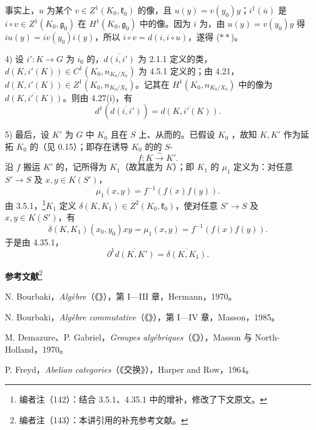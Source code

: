事实上，$u$ 为某个 $v\in Z^1(K_0,\mathfrak k_0)$ 的像，且 $u(y)=v(y_0)y$；$i^1(\overline u)$ 是 $i\circ v\in Z^1(K_0,\mathfrak g_0)$ 在 $H^1(K_0,\mathfrak g_0)$ 中的像。因为 $i$ 为，由 $u(y)=v(y_0)y$ 得 $iu(y)=iv(y_0)i(y)$，所以 $i\circ v=d(i,i\circ u)$，遂得 ($**$)。

4) 设 $i':K\to G$ 为 $i_0$ 的，$\overline{d(i,i')}$ 为 2.1.1 定义的类，$d(K,i'(K))\in C^1(K_0,n_{K_0/X_0})$ 为 4.5.1 定义的；由 4.21，$d(K,i'(K))\in Z^1(K_0,n_{K_0/X_0})$。记其在 $H^1(K_0,n_{K_0/X_0})$ 中的像为 $\overline{d(K,i'(K))}$。则由 4.27(i)，有
\[d^1(\overline{d(i,i')})=\overline{d(K,i'(K))}.\tag{$\dagger$}\]

5) 最后，设 $K'$ 为 $G$ 中 $K_0$ 且在 $S$ 上、从而的。已假设 $K_0$ ，故知 $K,K'$ 作为延拓 $K_0$ 的（见 0.15）；即存在诱导 $K_0$ 的的 $S$-
\[f:K\xrightarrow\sim K'.\]
沿 $f$ 搬运 $K'$ 的，记所得为 $K_1$（故其底为 $K$）；即 $K_1$ 的 $\mu_1$ 定义为：对任意 $S'\to S$ 及 $x,y\in K(S')$，
\[\mu_1(x,y)=f^{-1}(f(x)f(y)).\]
由 3.5.1，\footnote{编者注（142）：结合 3.5.1、4.35.1 中的增补，修改了下文原文。}$K_1$ 定义 $\delta(K,K_1)\in Z^2(K_0,\mathfrak k_0)$，使对任意 $S'\to S$ 及 $x,y\in K(S')$，有
\[\delta(K,K_1)(x_0,y_0)xy=\mu_1(x,y)=f^{-1}(f(x)f(y)).\]
于是由 4.35.1，
\[\partial^1\overline{d(K,K')}=\overline{\delta(K,K_1)}.\tag{$\ddagger$}\]

\textbf{参考文献}\footnote{编者注（143）：本讲引用的补充参考文献。}

\noindent [BAlg] N. Bourbaki，\textit{Algèbre}（《》），第 I—III 章，Hermann，1970。

\noindent [BAC] N. Bourbaki，\textit{Algèbre commutative}（《》），第 I—IV 章，Masson，1985。

\noindent [DG70] M. Demazure、P. Gabriel，\textit{Groupes algébriques}（《》），Masson 与 North-Holland，1970。

\noindent [Fr64] P. Freyd，\textit{Abelian categories}（《交换》），Harper and Row，1964。
